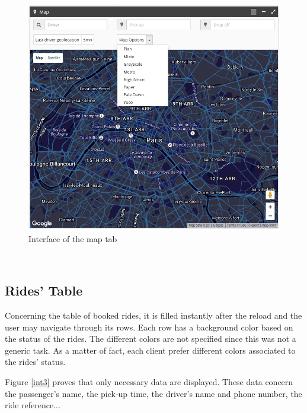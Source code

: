\begin{figure}[!htbp] 
\begin{center}
\includegraphics[width=6 in]{images/achievement/2.png}
\caption{Interface of the map tab}
\label{int2}
\end{center}
\end{figure}~

\subsection{Rides' Table }

Concerning the table of booked rides, it is filled instantly after the reload and the user may navigate through its rows.
Each row has a background color based on the status of the rides. The different colors are not specified since this was not a generic task. As a matter of fact, each client prefer different colors associated to the rides' status.

Figure \ref{int3} proves that only necessary data are displayed. These data concern the passenger's name, the pick-up time, the driver's name and phone number, the ride reference...

